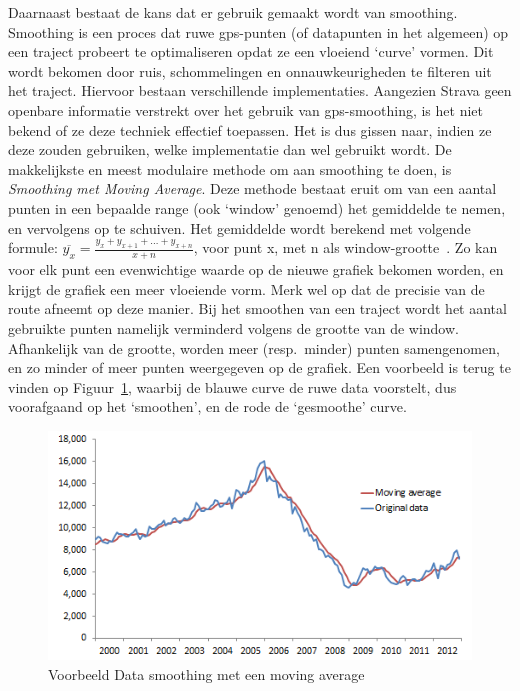 Daarnaast bestaat de kans dat er gebruik gemaakt wordt van smoothing. Smoothing
is een proces dat ruwe \ac{gps}-punten (of datapunten in het algemeen) op een
traject probeert te optimaliseren opdat ze een vloeiend `curve' vormen. Dit
wordt bekomen door ruis, schommelingen en onnauwkeurigheden te filteren uit het
traject. Hiervoor bestaan verschillende implementaties. Aangezien Strava geen
openbare informatie verstrekt over het gebruik van gps-smoothing, is het niet
bekend of ze deze techniek effectief toepassen. Het is dus gissen naar, indien
ze deze zouden gebruiken, welke implementatie dan wel gebruikt wordt. De
makkelijkste en meest modulaire methode om aan smoothing te doen, is
\textit{Smoothing met Moving Average}. Deze methode bestaat eruit om van een
aantal punten in een bepaalde range (ook `window' genoemd) het gemiddelde te
nemen, en vervolgens op te schuiven. Het gemiddelde wordt berekend met volgende
formule: $\overline{y_x} = \frac{y_x + y_{x+1} + \ldots + y_{x+n}}{x+n}$, voor
punt x, met n als window-grootte~\cite{Smoothin16:online,
    SmoothingandInterpolatingNoisyGPSDatawithSmoothingSplines, Smoothin86:online}.
Zo kan voor elk punt een evenwichtige waarde op de nieuwe grafiek bekomen
worden, en krijgt de grafiek een meer vloeiende vorm. Merk wel op dat de
precisie van de route afneemt op deze manier. Bij het smoothen van een traject
wordt het aantal gebruikte punten namelijk verminderd volgens de grootte van de
window. Afhankelijk van de grootte, worden meer (resp.\ minder) punten
samengenomen, en zo minder of meer punten weergegeven op de grafiek. Een
voorbeeld is terug te vinden op Figuur~\ref{fig:SmoothingExample}, waarbij de
blauwe curve de ruwe data voorstelt, dus voorafgaand op het `smoothen', en de
rode de `gesmoothe' curve.
\begin{figure}[h]
    \centering
    \includegraphics[width=0.6\linewidth]{fig/SmoothingExample.png}
    \caption{Voorbeeld Data smoothing met een moving average~\cite{SmoothingandInterpolatingNoisyGPSDatawithSmoothingSplines}}\label{fig:SmoothingExample}
\end{figure}

